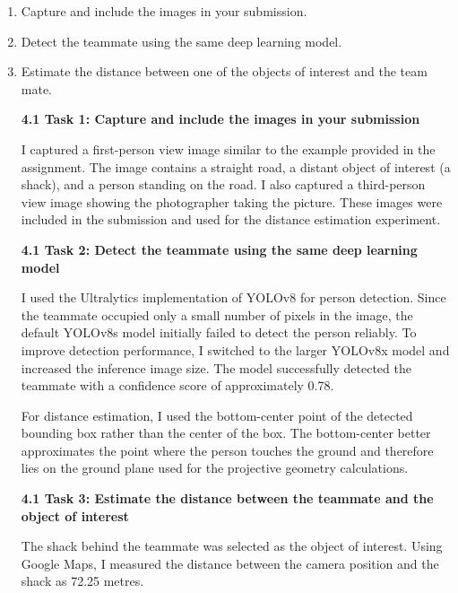 \begin{enumerate}
\item Capture and include the images in your submission.
\item Detect the teammate using the same deep learning model.
\item Estimate the distance between one of the objects of interest and
  the team mate.
\begin{studentSpace}
    \textbf{4.1 Task 1: Capture and include the images in your submission}

I captured a first-person view image similar to the example provided in the assignment. The image contains a straight road, a distant object of interest (a shack), and a person standing on the road. I also captured a third-person view image showing the photographer taking the picture. These images were included in the submission and used for the distance estimation experiment.

\bigskip

\textbf{4.1 Task 2: Detect the teammate using the same deep learning model}

I used the Ultralytics implementation of YOLOv8 for person detection. Since the teammate occupied only a small number of pixels in the image, the default YOLOv8s model initially failed to detect the person reliably. To improve detection performance, I switched to the larger YOLOv8x model and increased the inference image size. The model successfully detected the teammate with a confidence score of approximately 0.78.

For distance estimation, I used the bottom-center point of the detected bounding box rather than the center of the box. The bottom-center better approximates the point where the person touches the ground and therefore lies on the ground plane used for the projective geometry calculations.

\bigskip

\textbf{4.1 Task 3: Estimate the distance between the teammate and the object of interest}

The shack behind the teammate was selected as the object of interest. Using Google Maps, I measured the distance between the camera position and the shack as 72.25 metres.


\end{studentSpace}
\end{enumerate}
